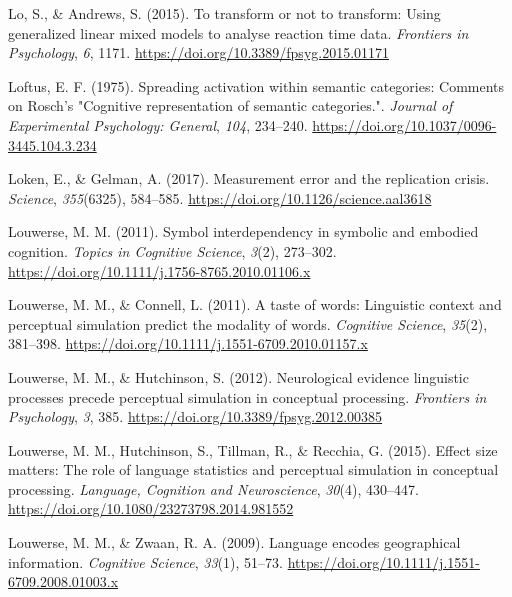 \documentclass[
  12pt,
  man,floatsintext]{apa7}
\newlength{\cslhangindent}
\newlength{\cslentryspacingunit} %
\newenvironment{CSLReferences}[2] %
 {%
  \setlength{\parindent}{0pt}
  \ifodd #1
  \let\oldpar\par
  \def\par{\hangindent=\cslhangindent\oldpar}
  \fi
  \setlength{\parskip}{#2\cslentryspacingunit}
 }%
 {}
\begin{document}
\begin{CSLReferences}{1}{0}
\leavevmode{}%
Lo, S., \& Andrews, S. (2015). To transform or not to transform: Using generalized linear mixed models to analyse reaction time data. \emph{Frontiers in Psychology}, \emph{6}, 1171. \url{https://doi.org/10.3389/fpsyg.2015.01171}

\leavevmode{}%
Loftus, E. F. (1975). Spreading activation within semantic categories: {Comments} on {Rosch}'s "{Cognitive} representation of semantic categories.". \emph{Journal of Experimental Psychology: General}, \emph{104}, 234--240. \url{https://doi.org/10.1037/0096-3445.104.3.234}

\leavevmode{}%
Loken, E., \& Gelman, A. (2017). Measurement error and the replication crisis. \emph{Science}, \emph{355}(6325), 584--585. \url{https://doi.org/10.1126/science.aal3618}

\leavevmode{}%
Louwerse, M. M. (2011). Symbol interdependency in symbolic and embodied cognition. \emph{Topics in Cognitive Science}, \emph{3}(2), 273--302. \url{https://doi.org/10.1111/j.1756-8765.2010.01106.x}

\leavevmode{}%
Louwerse, M. M., \& Connell, L. (2011). A taste of words: Linguistic context and perceptual simulation predict the modality of words. \emph{Cognitive Science}, \emph{35}(2), 381--398. \url{https://doi.org/10.1111/j.1551-6709.2010.01157.x}

\leavevmode{}%
Louwerse, M. M., \& Hutchinson, S. (2012). Neurological evidence linguistic processes precede perceptual simulation in conceptual processing. \emph{Frontiers in Psychology}, \emph{3}, 385. \url{https://doi.org/10.3389/fpsyg.2012.00385}

\leavevmode{}%
Louwerse, M. M., Hutchinson, S., Tillman, R., \& Recchia, G. (2015). Effect size matters: {The} role of language statistics and perceptual simulation in conceptual processing. \emph{Language, Cognition and Neuroscience}, \emph{30}(4), 430--447. \url{https://doi.org/10.1080/23273798.2014.981552}

\leavevmode{}%
Louwerse, M. M., \& Zwaan, R. A. (2009). Language encodes geographical information. \emph{Cognitive Science}, \emph{33}(1), 51--73. \url{https://doi.org/10.1111/j.1551-6709.2008.01003.x}


\end{CSLReferences}
\end{document}
